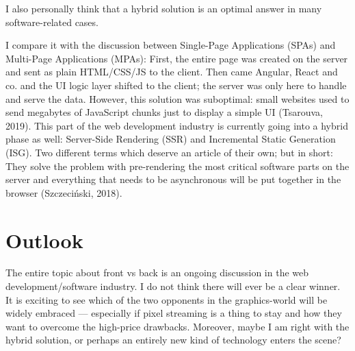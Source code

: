 \documentclass[10pt]{article}
\begin{document}
\begin{sloppypar}
  I also personally think that a hybrid solution is an optimal answer in many software-related cases.

  I compare it with the discussion between Single-Page Applications (SPAs) and Multi-Page Applications (MPAs): First, the entire page was created on the server and sent as plain HTML/CSS/JS to the client. Then came Angular, React and co. and the UI logic layer shifted to the client; the server was only here to handle and serve the data. However, this solution was suboptimal: small websites used to send megabytes of JavaScript chunks just to display a simple UI (Tsarouva, 2019). This part of the web development industry is currently going into a hybrid phase as well: Server-Side Rendering (SSR) and Incremental Static Generation (ISG). Two different terms which deserve an article of their own; but in short: They solve the problem with pre-rendering the most critical software parts on the server and everything that needs to be asynchronous will be put together in the browser (Szczeciński, 2018).

  \section{Outlook}
  \label{sec:outlook}

  The entire topic about front vs back is an ongoing discussion in the web development/software industry. I do not think there will ever be a clear winner. It is exciting to see which of the two opponents in the graphics-world will be widely embraced — especially if pixel streaming is a thing to stay and how they want to overcome the high-price drawbacks. Moreover, maybe I am right with the hybrid solution, or perhaps an entirely new kind of technology enters the scene?




  \pagebreak
  
  

\end{sloppypar}
\end{document}
